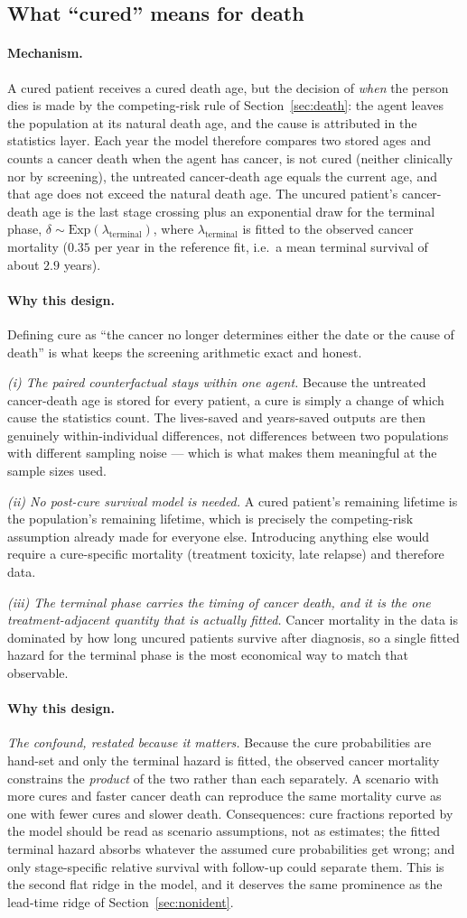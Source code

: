 \documentclass[12pt,a4paper]{article}
\newcommand{\mech}[1]{\paragraph{Mechanism.} #1}
\newcommand{\why}[1]{\paragraph{Why this design.} #1}
\begin{document}
\subsection{What ``cured'' means for death}

\mech{A cured patient receives a cured death age, but the decision of \emph{when} the person dies is made
by the competing-risk rule of Section~\ref{sec:death}: the agent leaves the population at its natural
death age, and the cause is attributed in the statistics layer. Each year the model therefore compares two
stored ages and counts a cancer death when the agent has cancer, is not cured (neither clinically nor by
screening), the untreated cancer-death age equals the current age, and that age does not exceed the
natural death age. The uncured patient's cancer-death age is the last stage crossing plus an exponential
draw for the terminal phase, $\delta \sim \mathrm{Exp}(\lambda_{\text{terminal}})$, where
$\lambda_{\text{terminal}}$ is fitted to the observed cancer mortality ($0.35$ per year in the reference
fit, i.e.\ a mean terminal survival of about $2.9$ years).}

\why{Defining cure as ``the cancer no longer determines either the date or the cause of death'' is what
keeps the screening arithmetic exact and honest.

\emph{(i) The paired counterfactual stays within one agent.} Because the untreated cancer-death age is
stored for every patient, a cure is simply a change of which cause the statistics count. The lives-saved
and years-saved outputs are then genuinely within-individual differences, not differences between two
populations with different sampling noise --- which is what makes them meaningful at the sample sizes
used.

\emph{(ii) No post-cure survival model is needed.} A cured patient's remaining lifetime is the
population's remaining lifetime, which is precisely the competing-risk assumption already made for
everyone else. Introducing anything else would require a cure-specific mortality (treatment toxicity,
late relapse) and therefore data.

\emph{(iii) The terminal phase carries the timing of cancer death, and it is the one treatment-adjacent
quantity that is actually fitted.} Cancer mortality in the data is dominated by how long uncured patients
survive after diagnosis, so a single fitted hazard for the terminal phase is the most economical way to
match that observable.}

\why{\emph{The confound, restated because it matters.} Because the cure probabilities are hand-set and
only the terminal hazard is fitted, the observed cancer mortality constrains the \emph{product} of the two
rather than each separately. A scenario with more cures and faster cancer death can reproduce the same
mortality curve as one with fewer cures and slower death. Consequences: cure fractions reported by the
model should be read as scenario assumptions, not as estimates; the fitted terminal hazard absorbs
whatever the assumed cure probabilities get wrong; and only stage-specific relative survival with
follow-up could separate them. This is the second flat ridge in the model, and it deserves the same
prominence as the lead-time ridge of Section~\ref{sec:nonident}.}
\end{document}
